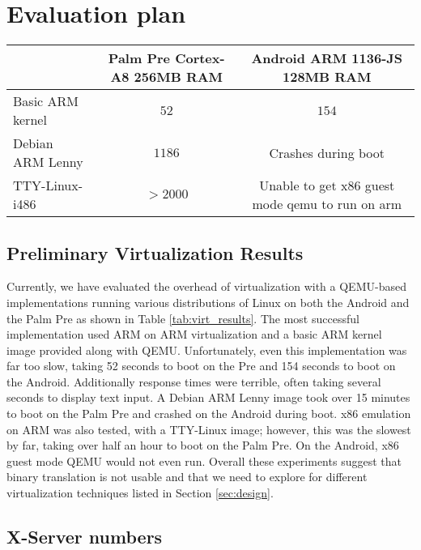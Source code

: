 \section{Evaluation plan}
\label{sec:eval}

\begin{table*}[tbh]
\begin{tabular}{|l|c|c|}
\hline & Palm Pre Cortex-A8 256MB RAM & Android ARM 1136-JS 128MB RAM \\ 
\hline Basic ARM kernel & $52$ & $154$ \\ [2pt]
 Debian ARM Lenny & $1186$ & Crashes during boot \\ [2pt]
 TTY-Linux-i486 & $>2000$ & Unable to get x86 guest mode qemu to run on arm \\[2pt]
\hline 
\end{tabular}
\caption{
Virtualization Results: Kernel Boot time in seconds
}
\label{tab:virt_results}
\end{table*}

\subsection{Preliminary Virtualization Results}

Currently, we have evaluated the overhead of virtualization with a QEMU-based implementations running various distributions of Linux on both the Android and the Palm Pre as shown in Table \ref{tab:virt_results}. The most successful implementation used ARM on ARM virtualization and a basic ARM kernel image provided along with QEMU. Unfortunately, even this implementation was far too slow, taking 52 seconds to boot on the Pre and 154 seconds to boot on the Android. Additionally response times were terrible, often taking several seconds to display text input. A Debian ARM Lenny image took over 15 minutes to boot on the Palm Pre and crashed on the Android during boot. x86 emulation on ARM was also tested, with a TTY-Linux image; however, this was the slowest by far, taking over half an hour to boot on the Palm Pre. On the Android, x86 guest mode QEMU would not even run. Overall these experiments suggest that binary translation is not usable and that we need to explore for different virtualization techniques listed in Section \ref{sec:design}.

\subsection{X-Server numbers}

